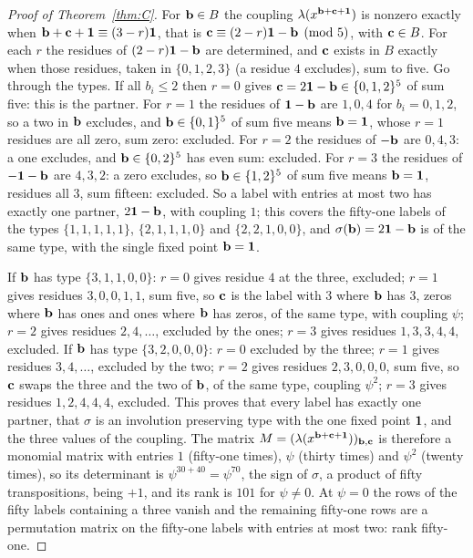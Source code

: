 \begin{proof}[Proof of Theorem~\ref{thm:C}]
For $\mathbf{b}\in B$ the coupling $\lambda(x^{\mathbf{b}+\mathbf{c}+\mathbf{1}})$ is nonzero exactly
when $\mathbf{b}+\mathbf{c}+\mathbf{1}\equiv(3-r)\mathbf{1}$, that is $\mathbf{c}\equiv(2-r)\mathbf{1}-\mathbf{b}\pmod5$,
with $\mathbf{c}\in B$. For each $r$ the residues of $(2-r)\mathbf{1}-\mathbf{b}$ are
determined, and $\mathbf{c}$ exists in $B$ exactly when those residues, taken in
$\{0,1,2,3\}$ (a residue $4$ excludes), sum to five. Go through the types.
If all $b_i\le2$ then $r=0$ gives $\mathbf{c}=2\mathbf{1}-\mathbf{b}\in\{0,1,2\}^5$ of sum five:
this is the partner. For $r=1$ the residues of $\mathbf{1}-\mathbf{b}$ are $1,0,4$ for
$b_i=0,1,2$, so a two in $\mathbf{b}$ excludes, and $\mathbf{b}\in\{0,1\}^5$ of sum five
means $\mathbf{b}=\mathbf{1}$, whose $r=1$ residues are all zero, sum zero: excluded. For
$r=2$ the residues of $-\mathbf{b}$ are $0,4,3$: a one excludes, and $\mathbf{b}\in\{0,2\}^5$
has even sum: excluded. For $r=3$ the residues of $-\mathbf{1}-\mathbf{b}$ are $4,3,2$: a
zero excludes, so $\mathbf{b}\in\{1,2\}^5$ of sum five means $\mathbf{b}=\mathbf{1}$, residues
all $3$, sum fifteen: excluded. So a label with entries at most two has
exactly one partner, $2\mathbf{1}-\mathbf{b}$, with coupling $1$; this covers the
fifty-one labels of the types $\{1,1,1,1,1\}$, $\{2,1,1,1,0\}$ and
$\{2,2,1,0,0\}$, and $\sigma(\mathbf{b})=2\mathbf{1}-\mathbf{b}$ is of the same type, with the
single fixed point $\mathbf{b}=\mathbf{1}$.

If $\mathbf{b}$ has type $\{3,1,1,0,0\}$: $r=0$ gives residue $4$ at the three,
excluded; $r=1$ gives residues $3,0,0,1,1$, sum five, so $\mathbf{c}$ is the label
with $3$ where $\mathbf{b}$ has $3$, zeros where $\mathbf{b}$ has ones and ones where
$\mathbf{b}$ has zeros, of the same type, with coupling $\psi$; $r=2$ gives
residues $2,4,\dots$, excluded by the ones; $r=3$ gives residues $1,3,3,4,4$,
excluded. If $\mathbf{b}$ has type $\{3,2,0,0,0\}$: $r=0$ excluded by the three;
$r=1$ gives residues $3,4,\dots$, excluded by the two; $r=2$ gives residues
$2,3,0,0,0$, sum five, so $\mathbf{c}$ swaps the three and the two of $\mathbf{b}$, of the
same type, coupling $\psi^2$; $r=3$ gives residues $1,2,4,4,4$, excluded.
This proves that every label has exactly one partner, that
$\sigma$ is an involution preserving type with the one fixed point $\mathbf{1}$,
and the three values of the coupling. The matrix $M=(\lambda(x^{\mathbf{b}+\mathbf{c}+
\mathbf{1}}))_{\mathbf{b},\mathbf{c}}$ is therefore a monomial matrix with entries $1$ (fifty-one
times), $\psi$ (thirty times) and $\psi^2$ (twenty times), so its
determinant is $\psi^{30+40}=\psi^{70}$, the sign of $\sigma$, a product of
fifty transpositions, being $+1$, and its rank is $101$ for
$\psi\ne0$. At $\psi=0$ the rows of the fifty labels containing a three
vanish and the remaining fifty-one rows are a permutation matrix on the
fifty-one labels with entries at most two: rank fifty-one.


\end{proof}
